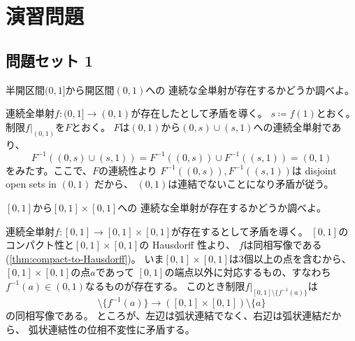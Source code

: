 \documentclass[report]{jlreq}
\begin{document}
%
\newpage
\section{演習問題}

\subsection{問題セット 1}

\begin{problem}[幾何学II 1.1]
    半開区間$(0, 1]$から開区間$(0, 1)$への
    連続な全単射が存在するかどうか調べよ。
\end{problem}

\begin{answer}
    連続全単射$f \colon (0, 1] \to (0, 1)$が存在したとして矛盾を導く。
    $s \coloneqq f(1)$とおく。
    制限$f|_{(0, 1)}$を$F$とおく。
    $F$は$(0, 1)$から$(0, s) \cup (s, 1)$への連続全単射であり、
    \begin{equation}
        F^{-1}((0, s) \cup (s, 1))
            = F^{-1}((0, s)) \cup F^{-1}((s, 1))
            = (0, 1)
    \end{equation}
    をみたす。ここで、$F$の連続性より
    $F^{-1}((0, s)), F^{-1}((s, 1))$は
    disjoint open sets in $(0, 1)$ だから、
    $(0, 1)$は連結でないことになり矛盾が従う。
\end{answer}

\begin{problem}[幾何学II 1.2]
    $[0, 1]$から$[0, 1] \times [0, 1]$への
    連続な全単射が存在するかどうか調べよ。
\end{problem}

\begin{answer}
    連続全単射$f \colon [0, 1] \to [0, 1] \times [0, 1]$が存在するとして矛盾を導く。
    $[0, 1]$のコンパクト性と$[0, 1] \times [0, 1]$の Hausdorff 性より、
    $f$は同相写像である (\cref{thm:compact-to-Hausdorff})。
    いま$[0, 1] \times [0, 1]$は3個以上の点を含むから、
    $[0, 1] \times [0, 1]$の点$a$であって
    $[0, 1]$の端点以外に対応するもの、すなわち
    $f^{-1}(a) \in (0, 1)$なるものが存在する。
    このとき制限$f|_{[0, 1] \setminus \{ f^{-1}(a) \}}$は
    \begin{equation}
        [0, 1] \setminus \{ f^{-1}(a) \}
        \to
        ([0, 1] \times [0, 1]) \setminus \{a\}
    \end{equation}
    の同相写像である。
    ところが、左辺は弧状連結でなく、右辺は弧状連結だから、
    弧状連結性の位相不変性に矛盾する。
\end{answer}
\end{document}
